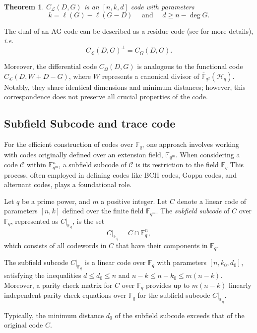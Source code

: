 \documentclass[a4paper]{amsart}
\theoremstyle{plain}
\newtheorem{theorem}{Theorem}[section]
\theoremstyle{definition}
\theoremstyle{remark}
\newcommand{\calL}{\mathcal{L}}
\newcommand{\calC}{\mathcal{C}}
\begin{document}
\begin{theorem}\cite[Theorem~2.2.2]{stichtenoth2009algebraic}
	$C_{\calL}(D, G)$ is an $[n, k, d]$ code with parameters
	\[
		k=\ell(G)-\ell(G-D) \quad \text { and } \quad d \geq n-\deg G .
	\]
\end{theorem}

The dual of an AG code can be described as a residue code (see \cite{stichtenoth2009algebraic} for more details), \emph{i.e.}
\[ C_{\calL}(D,G)^{\perp} = C_{\Omega}(D,G).\]


Moreover, the differential code $C_{\Omega}(D, G)$ is analogous to the functional code $C_{\mathcal{L}}(D, W+D-G)$, where $W$ represents a canonical divisor of $\overline{\mathbb{F}}_{q^2}(\mathscr{H}_q)$. Notably, they share identical dimensions and minimum distances; however, this correspondence does not preserve all crucial properties of the code.


\subsection*{Subfield Subcode and trace code}
For the efficient construction of codes over $\mathbb{F}_q$, one approach involves working with codes originally defined over an extension field, $\mathbb{F}_{q^m}$. When considering a code $\calC$ within $\mathbb{F}_{q^m}^n$, a subfield subcode of $\calC$ is its restriction to the field $\mathbb{F}_q$
This process, often employed in defining codes like BCH codes, Goppa codes, and alternant codes, plays a foundational role.

Let $q$ be a prime power, and $m$ a positive integer. Let $C$ denote a linear code of parameters $[n,k]$ defined over the finite field $\mathbb{F}_{q^m}$. The \emph{subfield subcode} of $C$ over $\mathbb{F}_q$, represented as $C|_{\mathbb{F}_q}$, is the set
\[
	C|_{\mathbb{F}_q} = C \cap \mathbb{F}_q^n,
\]
which consists of all codewords in $C$ that have their components in $\mathbb{F}_q$. 


The subfield subcode $C|_{\mathbb{F}_q}$ is a linear code over $\mathbb{F}_q$ with parameters $[n,k_0,d_0]$, satisfying the inequalities $d \leq d_0 \leq n$ and $n-k \leq n-k_0 \leq m(n-k)$. Moreover, a parity check matrix for $C$ over $\mathbb{F}_q$ provides up to $m(n-k)$ linearly independent parity check equations over $\mathbb{F}_q$ for the subfield subcode $C|_{\mathbb{F}_q}$.

Typically, the minimum distance $d_0$ of the subfield subcode exceeds that of the original code $C$.
\end{document}
